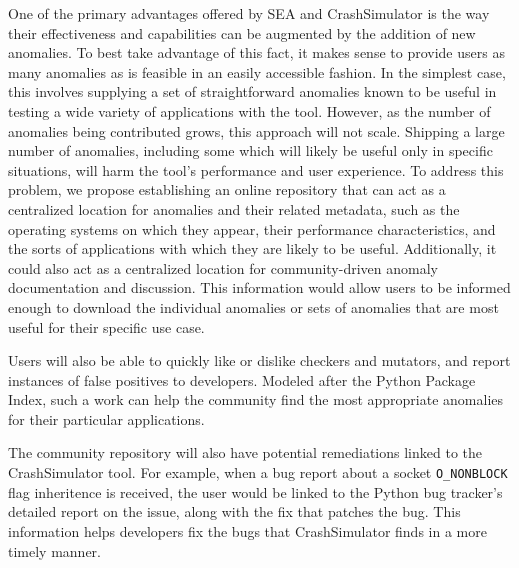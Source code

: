 One of the primary advantages offered by SEA and CrashSimulator is the way
their effectiveness and capabilities can be augmented by the addition of
new anomalies.  To best take advantage of this fact, it makes sense to
provide users as many anomalies as is feasible in an easily accessible
fashion.  In the simplest case, this involves supplying a set of
straightforward anomalies known to be useful in testing a wide
variety of applications with the tool.
However, as the number of anomalies being contributed grows, this approach
will not scale.  Shipping a large number of anomalies, including some
which will likely be useful only in specific situations, will harm the
tool's performance and user experience.  To address this problem, we
propose establishing an online repository
that can act as a centralized location for anomalies
and their related metadata,
such as the operating systems on which they appear,
their performance characteristics, and the sorts of applications
with which they are likely to be useful.  Additionally, it could also
act as a centralized location for community-driven anomaly documentation
and discussion.  This information would allow users to be informed enough
to download the individual anomalies or sets of anomalies that are most
useful for their specific use case.

Users will also be able to quickly like or dislike checkers and mutators,
and report instances of false positives to developers.
Modeled after the Python Package Index,
such a work can help the community find the most appropriate
anomalies for their particular applications.

The community repository will also have potential remediations linked to
the CrashSimulator tool.  For example, when a bug report about a
socket {\tt O\_NONBLOCK} flag inheritence is received, the user would be linked
to the Python
bug tracker's detailed report on the issue, along with the fix that
patches the bug.  This information helps developers fix the
bugs that CrashSimulator finds in a more timely manner.


%


%


